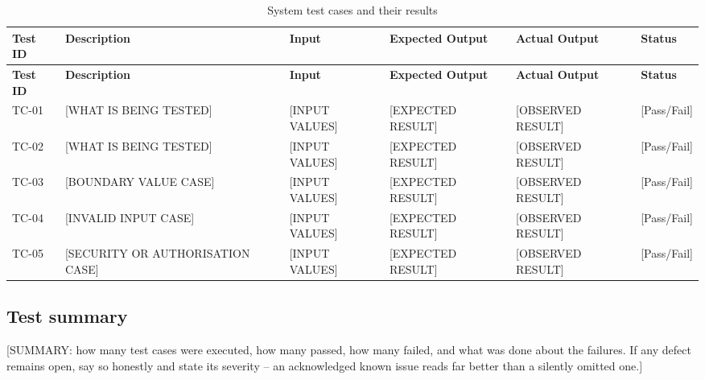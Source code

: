 {\small
\begin{longtable}{|l|p{2.6cm}|p{2.2cm}|p{2.4cm}|p{2.4cm}|l|}
  \caption{System test cases and their results}
  \label{tab:test-cases} \\
  \hline
  \textbf{Test ID} & \textbf{Description} & \textbf{Input} &
  \textbf{Expected Output} & \textbf{Actual Output} & \textbf{Status} \\
  \hline
  \endfirsthead

  \hline
  \textbf{Test ID} & \textbf{Description} & \textbf{Input} &
  \textbf{Expected Output} & \textbf{Actual Output} & \textbf{Status} \\
  \hline
  \endhead

  \hline
  \endfoot

  TC-01 & [WHAT IS BEING TESTED] & [INPUT VALUES] &
         [EXPECTED RESULT] & [OBSERVED RESULT] & [Pass/Fail] \\
  \hline
  TC-02 & [WHAT IS BEING TESTED] & [INPUT VALUES] &
         [EXPECTED RESULT] & [OBSERVED RESULT] & [Pass/Fail] \\
  \hline
  TC-03 & [BOUNDARY VALUE CASE] & [INPUT VALUES] &
         [EXPECTED RESULT] & [OBSERVED RESULT] & [Pass/Fail] \\
  \hline
  TC-04 & [INVALID INPUT CASE] & [INPUT VALUES] &
         [EXPECTED RESULT] & [OBSERVED RESULT] & [Pass/Fail] \\
  \hline
  TC-05 & [SECURITY OR AUTHORISATION CASE] & [INPUT VALUES] &
         [EXPECTED RESULT] & [OBSERVED RESULT] & [Pass/Fail] \\
  \hline
\end{longtable}
}

\subsection{Test summary}
\label{subsec:test-summary}

[SUMMARY: how many test cases were executed, how many passed, how many
failed, and what was done about the failures. If any defect remains
open, say so honestly and state its severity -- an acknowledged known
issue reads far better than a silently omitted one.]
